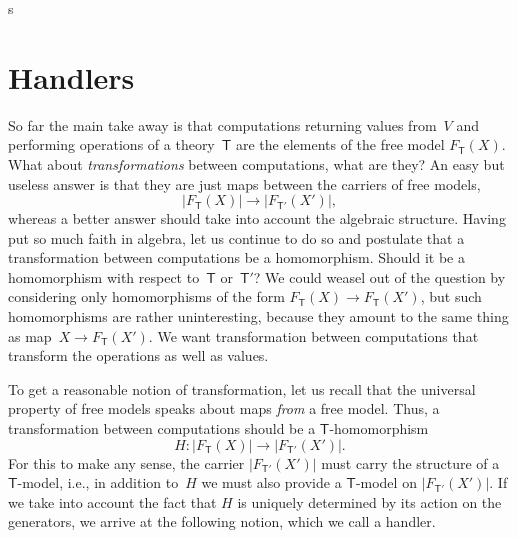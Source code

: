 s\documentclass{amsart}
\newcommand{\theory}[1]{\mathsf{#1}} %
\newcommand{\carrier}[1]{|#1|} %
\newcommand{\Free}[2]{F_{\theory{#1}}(#2)} %
\begin{document}
\section{Handlers}
\label{sec:handlers}

So far the main take away is that computations returning values from~$V$ and
performing operations of a theory~$\theory{T}$ are the elements of the free
model $\Free{T}{X}$. What about \emph{transformations} between computations,
what are they? An easy but useless answer is that they are just maps between the
carriers of free models,
%
\begin{equation*}
  \carrier{\Free{T}{X}} \longrightarrow \carrier{\Free{T'}{X'}},
\end{equation*}
%
whereas a better answer should take into account the algebraic structure. Having
put so much faith in algebra, let us continue to do so and postulate that a
transformation between computations be a homomorphism. Should it be a
homomorphism with respect to~$\theory{T}$ or~$\theory{T}'$? We could weasel out
of the question by considering only homomorphisms of the form
$\Free{T}{X} \to \Free{T}{X'}$, but such homomorphisms are rather uninteresting,
because they amount to the same thing as map~$X \to \Free{T}{X'}$. We want
transformation between computations that transform the operations as well as
values.

To get a reasonable notion of transformation, let us recall that the universal
property of free models speaks about maps \emph{from} a free model. Thus, a
transformation between computations should be a $\theory{T}$-homomorphism
%
\begin{equation*}
  H : \carrier{\Free{T}{X}} \longrightarrow \carrier{\Free{T'}{X'}}.
\end{equation*}
%
For this to make any sense, the carrier $\carrier{\Free{T'}{X'}}$ must carry the
structure of a $\theory{T}$-model, i.e., in addition to~$H$ we must also
provide a $\theory{T}$-model on $\carrier{\Free{T'}{X'}}$. If we take into account the
fact that $H$ is uniquely determined by its action on the generators, we
arrive at the following notion, which we call a handler.
\end{document}
